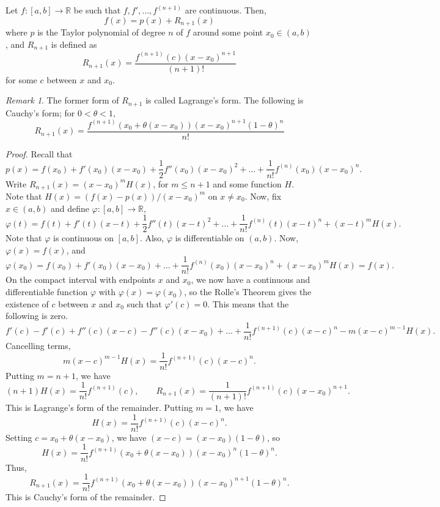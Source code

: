 \documentclass[11pt]{article}
\def\R{\mathbb{R}}
\theoremstyle{definition}
\theoremstyle{remark}
\newtheorem*{remark}{Remark}
\numberwithin{equation}{module}
\begin{document}
    \begin{theorem}
        Let $f\colon [a, b] \to \R$ be such that $f, f', \dots, f^{(n + 1)}$ are
        continuous. Then, \[
            f(x) = p(x) + R_{n + 1}(x)
        \] where $p$ is the Taylor polynomial of degree $n$ of 
        $f$ around some point $x_0 \in (a, b)$, and $R_{n + 1}$ is defined as \[
            R_{n + 1}(x) = \frac{f^{(n + 1)}(c)(x - x_0)^{n + 1}}{(n + 1)!}
        \] for some $c$ between $x$ and $x_0$.

        \begin{remark}
            The former form of $R_{n + 1}$ is called Lagrange's form. The following
            is Cauchy's form; for $0 < \theta < 1$, \[
                R_{n + 1}(x) = \frac{f^{(n + 1)}(x_0 + \theta(x - x_0))(x -
                x_0)^{n + 1}(1 - \theta)^n}{n!}
            \] 
        \end{remark}
    \end{theorem}
    \begin{proof}
        Recall that \[
            p(x) = f(x_0) + f'(x_0)(x - x_0) + \frac{1}{2}f''(x_0)(x - x_0)^2 +
            \dots + \frac{1}{n!}f^{(n)}(x_0)(x - x_0)^n.
        \] Write $R_{n + 1}(x) = (x - x_0)^m H(x)$, for $m \leq n + 1$ and some function
        $H$. Note that $H(x) = (f(x) - p(x))/(x - x_0)^m$ on $x \neq x_0$. Now, fix
        $x \in (a, b)$ and define $\varphi\colon [a, b] \to \R$, \[
            \varphi(t) = f(t) + f'(t)(x - t) + \frac{1}{2}f''(t)(x - t)^2 + \dots +
            \frac{1}{n!}f^{(n)}(t)(x - t)^n + (x - t)^mH(x).
        \] Note that $\varphi$ is continuous on $[a, b]$. Also, $\varphi$ is
        differentiable on $(a, b)$. Now, $\varphi(x) = f(x)$, and \[
            \varphi(x_0) = f(x_0) + f'(x_0)(x - x_0) + \dots +
            \frac{1}{n!}f^{(n)}(x_0)(x - x_0)^n + (x - x_0)^mH(x) = f(x).
        \] On the compact interval with endpoints $x$ and $x_0$, we now have a
        continuous and differentiable function $\varphi$ with $\varphi(x) =
        \varphi(x_0)$, so the Rolle's Theorem gives the existence of $c$ between
        $x$ and $x_0$ such that $\varphi'(c) = 0$. This means that the following is
        zero. \[
            f'(c) - f'(c) + f''(c)(x - c) - f''(c)(x - x_0) + 
            \dots + \frac{1}{n!}f^{(n + 1)}(c)(x - c)^n - m(x - c)^{m - 1}H(x).
        \] Cancelling terms, \[
            m(x - c)^{m - 1}H(x) = \frac{1}{n!}f^{(n + 1)}(c)(x - c)^n.
        \] Putting $m = n + 1$, we have \[
            (n + 1)H(x) = \frac{1}{n!}f^{(n + 1)}(c), \qquad
            R_{n + 1}(x) = \frac{1}{(n + 1)!}f^{(n + 1)}(c)(x - x_0)^{n + 1}.
        \] This is Lagrange's form of the remainder.
        Putting $m = 1$, we have \[
            H(x) = \frac{1}{n!}f^{(n + 1)}(c)(x - c)^n.
        \] Setting $c = x_0 + \theta(x - x_0)$, we have $(x - c) = (x - x_0)(1 -
        \theta)$, so \[
            H(x) = \frac{1}{n!}f^{(n + 1)}(x_0 + \theta(x - x_0))(x - x_0)^n(1 -
            \theta)^n.
        \] Thus, \[
            R_{n + 1}(x) = \frac{1}{n!}f^{(n + 1)}(x_0 + \theta(x - x_0))(x -
            x_0)^{n + 1}(1 - \theta)^n.
        \] This is Cauchy's form of the remainder.
    \end{proof}
\end{document}
